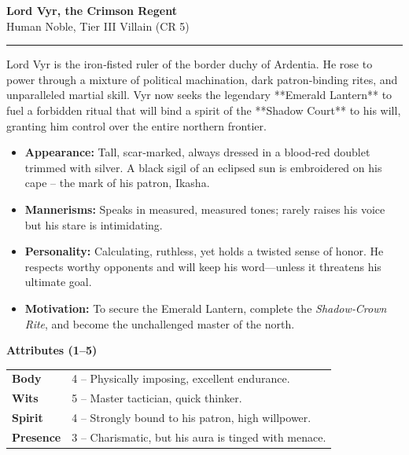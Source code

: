 \documentclass[12pt,a4paper]{article}
\begin{document}
\begin{center}
    {\LARGE \textbf{Lord Vyr, the Crimson Regent}}\\[4pt]
    {\large Human Noble, Tier III Villain (CR 5)}\\[2pt]
    \rule{\linewidth}{0.5pt}
\end{center}

Lord Vyr is the iron‑fisted ruler of the border duchy of Ardentia.  He rose to power
through a mixture of political machination, dark patron‑binding rites, and
unparalleled martial skill.  Vyr now seeks the legendary **Emerald Lantern** to
fuel a forbidden ritual that will bind a spirit of the **Shadow Court** to his
will, granting him control over the entire northern frontier.

\begin{itemize}[leftmargin=*]
    \item \textbf{Appearance:} Tall, scar‑marked, always dressed in a blood‑red
          doublet trimmed with silver.  A black sigil of an eclipsed sun is
          embroidered on his cape -- the mark of his patron, Ikasha.
    \item \textbf{Mannerisms:} Speaks in measured, measured tones;
          rarely raises his voice but his stare is intimidating.
    \item \textbf{Personality:} Calculating, ruthless, yet holds a twisted
          sense of honor.  He respects worthy opponents and will keep his
          word---unless it threatens his ultimate goal.
    \item \textbf{Motivation:} To secure the Emerald Lantern,
          complete the \emph{Shadow‑Crown Rite}, and become the
          unchallenged master of the north.
\end{itemize}

\noindent\textbf{Attributes (1--5)}\\[2pt]
\begin{tabular}{>{\bfseries}l>{\raggedright}p{6cm}}
Body    & 4 -- Physically imposing, excellent endurance.\\
Wits    & 5 -- Master tactician, quick thinker.\\
Spirit  & 4 -- Strongly bound to his patron, high willpower.\\
Presence& 3 -- Charismatic, but his aura is tinged with menace.\\
\end{tabular}
\end{document}
